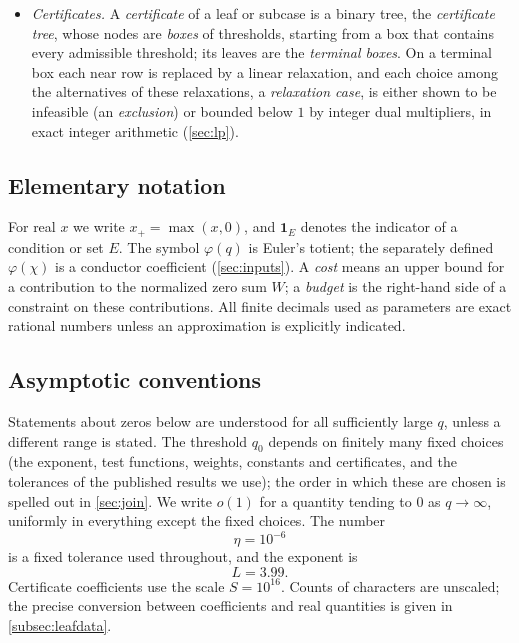 \documentclass[11pt]{amsart}
\numberwithin{equation}{section}
\theoremstyle{plain}
\theoremstyle{definition}
\theoremstyle{remark}
\newcommand{\1}{\mathbf{1}}
\begin{document}
\begin{itemize}
    has a \emph{feature}, a lower bound for how strongly its zero is detected, and a
    \emph{diagonal}, what it costs on its own, and one \emph{correlation term} bounds the
    interaction between distinct entries (\cref{prop:threshold}). The entries of a family whose
    zeros are known are grouped into \emph{family terms}. A row is built from two test functions,
    a \emph{detector} and a \emph{Gram test} (\cref{def:neardatum}); by the choice of its anchors and
    sieve weight it is a \emph{family}, \emph{shifted}, \emph{graded} or \emph{two-test} row
    (\cref{tab:rowkinds}). It is linear in the columns once an auxiliary number, its
    \emph{threshold} $\tau$, is fixed.
  \item \emph{Certificates.} A \emph{certificate} of a leaf or subcase is a binary tree, the
    \emph{certificate tree}, whose nodes are \emph{boxes} of thresholds, starting from a box that
    contains every admissible threshold; its leaves are the \emph{terminal boxes}. On a terminal
    box each near row is replaced by a linear relaxation, and each choice among the alternatives
    of these relaxations, a \emph{relaxation case}, is either shown to be infeasible (an
    \emph{exclusion}) or bounded below $1$ by integer dual multipliers, in exact integer
    arithmetic (\cref{sec:lp}).
\end{itemize}

\subsection{Elementary notation}
For real $x$ we write $x_+=\max(x,0)$, and $\1_E$ denotes the indicator of a condition or
set $E$. The symbol $\varphi(q)$ is Euler's totient; the separately defined
$\varphi(\chi)$ is a conductor coefficient (\cref{sec:inputs}). A \emph{cost} means an
upper bound for a contribution to the normalized zero sum $W$; a \emph{budget} is the
right-hand side of a constraint on these contributions. All finite decimals used as
parameters are exact rational numbers unless an approximation is explicitly indicated.

\subsection{Asymptotic conventions}
Statements about zeros below are understood for all sufficiently large $q$, unless a
different range is stated. The threshold $q_0$ depends on finitely many fixed choices
(the exponent, test functions, weights, constants and certificates, and the tolerances of the
published results we use); the order in which these are chosen is spelled out in \cref{sec:join}.
We write $o(1)$ for a quantity tending to $0$ as $q\to\infty$, uniformly in everything except
the fixed choices. The number
\[
  \eta=10^{-6}
\]
is a fixed tolerance used throughout, and the exponent is
\[
  L=3.99 .
\]
Certificate coefficients use the scale $S=10^{16}$. Counts of characters are unscaled;
the precise conversion between coefficients and real quantities is given in
\cref{subsec:leafdata}.
\end{document}
